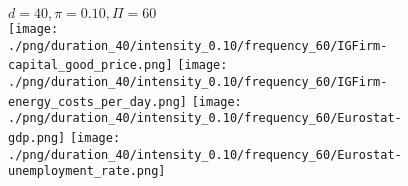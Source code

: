 \begin{figure}[ht!]
\centering\leavevmode
\begin{minipage}{13cm}
\centering\leavevmode
{$d=40, \pi=0.10, \Pi=60$}\\
\texttt{[image: ./png/duration\_40/intensity\_0.10/frequency\_60/IGFirm-capital\_good\_price.png]}
\texttt{[image: ./png/duration\_40/intensity\_0.10/frequency\_60/IGFirm-energy\_costs\_per\_day.png]}
\texttt{[image: ./png/duration\_40/intensity\_0.10/frequency\_60/Eurostat-gdp.png]}
\texttt{[image: ./png/duration\_40/intensity\_0.10/frequency\_60/Eurostat-unemployment\_rate.png]}
\end{minipage}
\end{figure}

